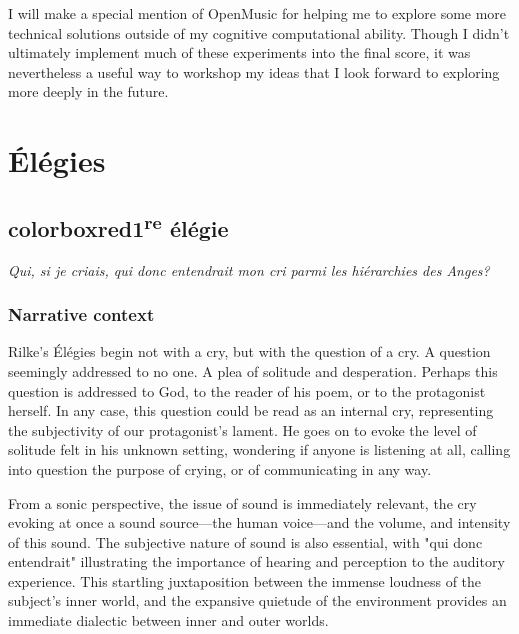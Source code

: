 \documentclass[12pt,twoside,maitrise]{dms_ks}
\theoremstyle{definition}
\begin{document}
{

I will make a special mention of OpenMusic for helping me to explore some more technical solutions outside of my cognitive computational ability. 
Though I didn't ultimately implement much of these experiments into the final score, it was nevertheless a useful way to workshop my ideas that I look forward to exploring more deeply in the future.

\chapter{Élégies}


\section{colorbox{red}{1\textsuperscript{re} élégie}}

\epigraph{\textit{Qui, si je criais, qui donc entendrait mon cri parmi les hiérarchies des Anges?}}{}

\subsection{Narrative context}
Rilke's Élégies begin not with a cry, but with the question of a cry.
A question seemingly addressed to no one.
A plea of solitude and desperation.
Perhaps this question is addressed to God, to the reader of his poem, or to the protagonist herself.
In any case, this question could be read as an internal cry, representing the subjectivity of our protagonist's lament.
He goes on to evoke the level of solitude felt in his unknown setting, wondering if anyone is listening at all, calling into question the purpose of crying, or of communicating in any way.

From a sonic perspective, the issue of sound is immediately relevant, the cry evoking at once a sound source---the human voice---and the volume, and intensity of this sound.
The subjective nature of sound is also essential, with "qui donc entendrait" illustrating the importance of hearing and perception to the auditory experience.
This startling juxtaposition between the immense loudness of the subject's inner world, and the expansive quietude of the environment provides an immediate dialectic between inner and outer worlds.

}
\end{document}

